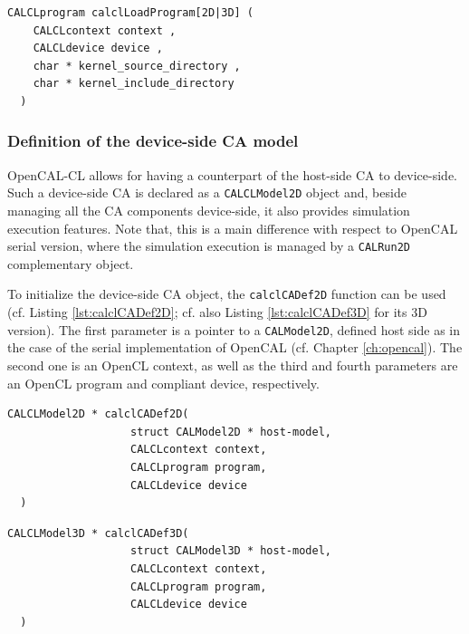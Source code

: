 \begin{lstlisting}[float,floatplacement=H, label=lst:calclLoadProgram, caption={The calclLoadProgram function. It loads and compiles kernels by returning an OpenCL program.}, numbers=none]
  CALCLprogram calclLoadProgram[2D|3D] (
    CALCLcontext context ,
    CALCLdevice device ,
    char * kernel_source_directory ,
    char * kernel_include_directory
  )
\end{lstlisting}

\subsubsection{Definition of the device-side CA model}

OpenCAL-CL allows for having a counterpart of the host-side CA to
device-side. Such a device-side CA is declared as a
\verb'CALCLModel2D' object and, beside managing all the CA components
device-side, it also provides simulation execution features. Note
that, this is a main difference with respect to OpenCAL serial
version, where the simulation execution is managed by a
\verb'CALRun2D' complementary object.

To initialize the device-side CA object, the \verb'calclCADef2D'
function can be used (cf. Listing \ref{lst:calclCADef2D}; cf. also
Listing \ref{lst:calclCADef3D} for its 3D version). The first
parameter is a pointer to a \verb'CALModel2D', defined host side as in
the case of the serial implementation of OpenCAL (cf. Chapter
\ref{ch:opencal}). The second one is an OpenCL context, as well as the
third and fourth parameters are an OpenCL program and compliant
device, respectively.


\begin{lstlisting}[float,floatplacement=H, label=lst:calclCADef2D, caption=The calclCADef2D function., numbers=none]
  CALCLModel2D * calclCADef2D(
                   struct CALModel2D * host-model,
                   CALCLcontext context,
                   CALCLprogram program,
                   CALCLdevice device
  )
\end{lstlisting}

\begin{lstlisting}[float,floatplacement=H, label=lst:calclCADef3D, caption=The calclCADef3D function., numbers=none]
  CALCLModel3D * calclCADef3D(
                   struct CALModel3D * host-model,
                   CALCLcontext context,
                   CALCLprogram program,
                   CALCLdevice device
  )
\end{lstlisting}


